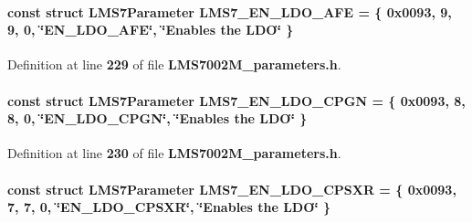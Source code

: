 \paragraph[{L\+M\+S7\+\_\+\+E\+N\+\_\+\+L\+D\+O\+\_\+\+A\+FE}]{\setlength{\rightskip}{0pt plus 5cm}const struct {\bf L\+M\+S7\+Parameter} L\+M\+S7\+\_\+\+E\+N\+\_\+\+L\+D\+O\+\_\+\+A\+FE = \{ 0x0093, 9, 9, 0, \char`\"{}\+E\+N\+\_\+\+L\+D\+O\+\_\+\+A\+F\+E\char`\"{}, \char`\"{}\+Enables the L\+D\+O\char`\"{} \}\hspace{0.3cm}{\ttfamily [static]}}\label{LMS7002M__parameters_8h_a955e27dcc6ca151e1717299c914d4c58}


Definition at line {\bf 229} of file {\bf L\+M\+S7002\+M\+\_\+parameters.\+h}.

\paragraph[{L\+M\+S7\+\_\+\+E\+N\+\_\+\+L\+D\+O\+\_\+\+C\+P\+GN}]{\setlength{\rightskip}{0pt plus 5cm}const struct {\bf L\+M\+S7\+Parameter} L\+M\+S7\+\_\+\+E\+N\+\_\+\+L\+D\+O\+\_\+\+C\+P\+GN = \{ 0x0093, 8, 8, 0, \char`\"{}\+E\+N\+\_\+\+L\+D\+O\+\_\+\+C\+P\+G\+N\char`\"{}, \char`\"{}\+Enables the L\+D\+O\char`\"{} \}\hspace{0.3cm}{\ttfamily [static]}}\label{LMS7002M__parameters_8h_a3fe48afa023aeec43f8693248a1ba278}


Definition at line {\bf 230} of file {\bf L\+M\+S7002\+M\+\_\+parameters.\+h}.

\paragraph[{L\+M\+S7\+\_\+\+E\+N\+\_\+\+L\+D\+O\+\_\+\+C\+P\+S\+XR}]{\setlength{\rightskip}{0pt plus 5cm}const struct {\bf L\+M\+S7\+Parameter} L\+M\+S7\+\_\+\+E\+N\+\_\+\+L\+D\+O\+\_\+\+C\+P\+S\+XR = \{ 0x0093, 7, 7, 0, \char`\"{}\+E\+N\+\_\+\+L\+D\+O\+\_\+\+C\+P\+S\+X\+R\char`\"{}, \char`\"{}\+Enables the L\+D\+O\char`\"{} \}\hspace{0.3cm}{\ttfamily [static]}}\label{LMS7002M__parameters_8h_a4fce94770941384b431a5666b7fcf1b2}


